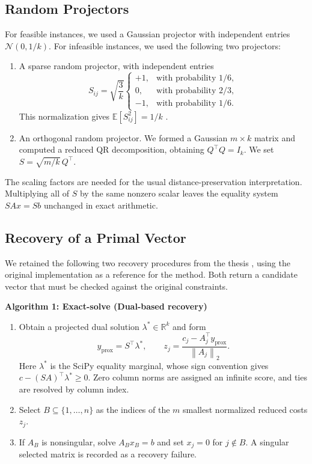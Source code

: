 \documentclass[12pt,letterpaper,oneside]{report}
\theoremstyle{definition}
\newcommand{\R}{\mathbb{R}}
\newcommand{\E}{\mathbb{E}}
\newcommand{\norm}[1]{\left\lVert #1\right\rVert}
\begin{document}
\subsection{Random Projectors}
For feasible instances, we used a Gaussian projector with independent
entries $\mathcal{N}(0,1/k)$. For infeasible instances, we used the
following two projectors:
\begin{enumerate}[label=\arabic*)]
\item A sparse random projector, with independent entries
\[
S_{ij}=\sqrt{\frac3k}
\begin{cases}
+1,&\text{with probability }1/6,\\
0,&\text{with probability }2/3,\\
-1,&\text{with probability }1/6.
\end{cases}
\]
This normalization gives $\E[S_{ij}^2]=1/k$ \cite{achlioptas2003}.
\item An orthogonal random projector. We formed a Gaussian
$m\times k$ matrix and computed a reduced QR decomposition, obtaining
$Q^\top Q=I_k$. We set $S=\sqrt{m/k}\,Q^\top$.
\end{enumerate}
The scaling factors are needed for the usual distance-preservation
interpretation. Multiplying all of $S$ by the same nonzero scalar leaves
the equality system $SAx=Sb$ unchanged in exact arithmetic.

\subsection{Recovery of a Primal Vector}
We retained the following two recovery procedures from the thesis
\cite{thesis2025}, using the original implementation \cite{legacyrepo}
as a reference for the method.
Both return a candidate vector that must be checked against the original
constraints.

\noindent\textbf{Algorithm 1: Exact-solve (Dual-based recovery)}
\begin{enumerate}[label=\arabic*:,nosep]
\item Obtain a projected dual solution $\lambda^*\in\R^k$ and form
\[
y_{\mathrm{prox}}=S^\top\lambda^*,\qquad
z_j=\frac{c_j-A_j^\top y_{\mathrm{prox}}}{\norm{A_j}_2}.
\]
Here $\lambda^*$ is the SciPy equality marginal, whose sign convention
gives $c-(SA)^\top\lambda^*\geq0$.
Zero column norms are assigned an infinite score, and ties are resolved
by column index.
\item Select $B\subseteq\{1,\ldots,n\}$ as the indices of the $m$
smallest normalized reduced costs $z_j$.
\item If $A_B$ is nonsingular, solve $A_Bx_B=b$ and set $x_j=0$ for
$j\notin B$. A singular selected matrix is recorded as a recovery failure.
\end{enumerate}
\end{document}
